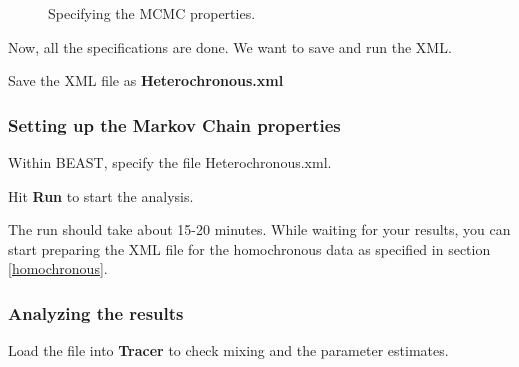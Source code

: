 \documentclass[11pt]{article}
\begin{document}
\begin{figure}[h!]
\centering
{}
\caption{\small Specifying the MCMC properties.}
\label{mcmc}
\end{figure}

Now, all the specifications are done. We want to save and run the XML.

\begin{framed}
Save the XML file as \textbf{Heterochronous.xml}
\end{framed}


\newpage
\subsubsection{Setting up the Markov Chain properties}

\begin{framed}
Within BEAST, specify the file Heterochronous.xml. %

Hit \textbf{Run} to start the analysis.
\end{framed}

The run should take about 15-20 minutes. While waiting for your results, you can start preparing the XML file for the homochronous data as specified in section \ref{homochronous}.



\bigskip
\subsubsection{Analyzing the results}

\begin{framed}
Load the file into \textbf{Tracer} to check mixing and the parameter estimates. 
\end{framed}
\end{document}

